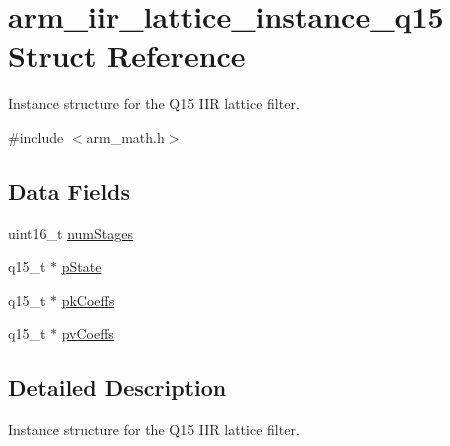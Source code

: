 \hypertarget{structarm__iir__lattice__instance__q15}{\section{arm\-\_\-iir\-\_\-lattice\-\_\-instance\-\_\-q15 Struct Reference}
\label{structarm__iir__lattice__instance__q15}
}


Instance structure for the Q15 I\-I\-R lattice filter.  




{\ttfamily \#include $<$arm\-\_\-math.\-h$>$}

\subsection*{Data Fields}
\begin{DoxyCompactItemize}
\item 
uint16\-\_\-t \hyperlink{structarm__iir__lattice__instance__q15_a4cceb90547b3e585d4c7aabaa8057212}{num\-Stages}
\item 
q15\-\_\-t $\ast$ \hyperlink{structarm__iir__lattice__instance__q15_ae29dfdb736374fcddaeaec4b7770170c}{p\-State}
\item 
q15\-\_\-t $\ast$ \hyperlink{structarm__iir__lattice__instance__q15_a12497c299b0341c18d497f8ab3465084}{pk\-Coeffs}
\item 
q15\-\_\-t $\ast$ \hyperlink{structarm__iir__lattice__instance__q15_a52866ed127c7b2a8a102e2ed1a2ebab8}{pv\-Coeffs}
\end{DoxyCompactItemize}


\subsection{Detailed Description}
Instance structure for the Q15 I\-I\-R lattice filter. 

